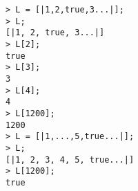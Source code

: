 \begin{center}\begin{minipage}{15cm}\begin{Verbatim}[frame=single]
> L = [|1,2,true,3...|];
> L;
[|1, 2, true, 3...|]
> L[2];
true
> L[3];
3
> L[4];
4
> L[1200];
1200
> L = [|1,...,5,true...|];
> L;
[|1, 2, 3, 4, 5, true...|]
> L[1200];
true
\end{Verbatim}
\end{minipage}\end{center}
